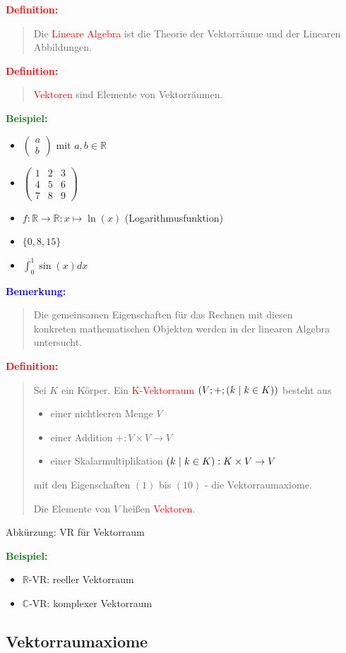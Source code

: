 \documentclass{article}
\newcommand{\smsp}{\phantom{\hspace{3px}}}
\newcommand{\red}[1]{\textcolor{red}{#1}}
\newcommand{\blue}[1]{\textcolor{blue}{#1}}
\newcommand{\green}[1]{\textcolor{green}{#1}}
\newcommand{\ex}{\green{\textbf{Beispiel: }}}
\newcommand{\de}[1]{\red{\textbf{Definition: }}\begin{quote}#1\end{quote}}
\newcommand{\an}[1]{\blue{\textbf{Bemerkung: }}\begin{quote}#1\end{quote}}
\newcommand{\R}{\mathbb{R}}
\newcommand{\C}{\mathbb{C}}
\renewcommand{\st}{\smsp | \smsp}
\newcommand{\vvec}[2]{\begin{pmatrix}#1\\#2\end{pmatrix}}
\begin{document}
\de{
    Die \red{Lineare Algebra} ist die Theorie der Vektorräume und der Linearen Abbildungen.
}
\de{
    \red{Vektoren} sind Elemente von Vektorräumen.
}
\ex
\begin{itemize}
    \item $\vvec{a}{b}$ mit $a,b \in \R$
    \item $\begin{pmatrix}
        1 & 2 & 3\\
        4 & 5 & 6\\
        7 & 8 & 9
    \end{pmatrix}$
    \item $f: \R \to \R: x \mapsto \ln(x)$ (Logarithmusfunktion)
    \item $\{0,8,15\}$
    \item $\int_{0}^{1} \sin(x)dx$
\end{itemize}

\an{
    Die gemeinsamen Eigenschaften für das Rechnen mit diesen\\
    konkreten mathematischen Objekten werden in der linearen Algebra untersucht.
}
\de{
    Sei $K$ ein Körper. Ein \red{K-Vektorraum} $(V; +; (k \st k \in K))$ besteht aus
    \begin{itemize}
        \item einer nichtleeren Menge $V$
        \item einer Addition $+: V \times V \to V$
        \item einer Skalarmultiplikation $(k \st k \in K): K \times V \to V$
    \end{itemize}
    mit den Eigenschaften $(1)$ bis $(10)$ - die Vektorraumaxiome.

    Die Elemente von $V$ heißen \red{Vektoren}.
}

Abkürzung: VR für Vektorraum

\ex 
\begin{itemize}
    \item $\R$-VR: reeller Vektorraum
    \item $\C$-VR: komplexer Vektorraum
\end{itemize}

\subsection{Vektorraumaxiome}
\end{document}
